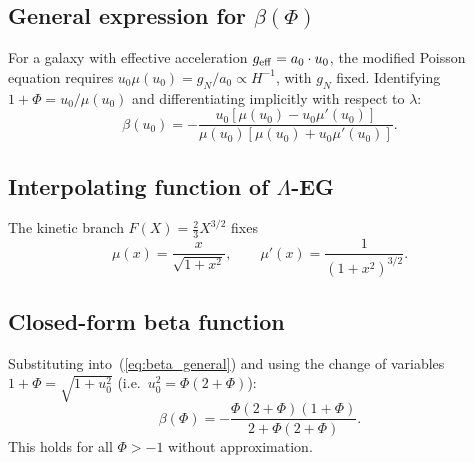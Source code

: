 \documentclass[11pt,a4paper]{article}
\begin{document}
\subsection{General expression for $\beta(\Phi)$}
For a galaxy with effective acceleration $g_{\rm eff} = a_0\cdot u_0$,
the modified Poisson equation requires $u_0\mu(u_0) = g_N/a_0\propto H^{-1}$,
with $g_N$ fixed.  Identifying $1+\Phi = u_0/\mu(u_0)$ and differentiating
implicitly with respect to $\lambda$:
\begin{equation}
  \beta(u_0) = -\frac{u_0\!\left[\mu(u_0)-u_0\mu'(u_0)\right]}
                     {\mu(u_0)\!\left[\mu(u_0)+u_0\mu'(u_0)\right]}.
  \label{eq:beta_general}
\end{equation}

\subsection{Interpolating function of $\Lambda$-EG}
The kinetic branch $F(X)=\tfrac{2}{3}X^{3/2}$ fixes
\begin{equation}
  \mu(x) = \frac{x}{\sqrt{1+x^2}}, \qquad \mu'(x) = \frac{1}{(1+x^2)^{3/2}}.
\end{equation}

\subsection{Closed-form beta function}
Substituting into~(\ref{eq:beta_general}) and using the change of variables
$1+\Phi = \sqrt{1+u_0^2}$ (i.e.\ $u_0^2 = \Phi(2+\Phi)$):
\begin{equation}
  \boxed{\beta(\Phi) = -\frac{\Phi(2+\Phi)(1+\Phi)}{2+\Phi(2+\Phi)}}.
  \label{eq:beta_exact}
\end{equation}
This holds for all $\Phi > -1$ without approximation.
\end{document}

